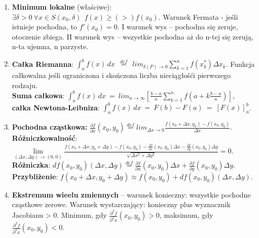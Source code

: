 \documentclass[12pt]{article}
\begin{document}
\begin{enumerate}
        \item \textbf{Minimum lokalne} (właściwe): $\exists \delta > 0 ~ \forall x \in S(x_0, \delta) ~~ f(x) \geq (>) f(x_0)$.
        Warunek Fermata - jeśli istnieje pochodna, to $f'(x_0) = 0$.
        I warunek wys -- pochodna się zeruje, otoczenie zbiega.
        II warunek wys -- wszystkie pochodna aż do n-tej się zerują, n-ta ujemna, n parzyste.

        \item \textbf{Całka Riemanna}: $\int_{a}^{b} f(x) \,dx ~~ \stackrel{def}{=} ~~ lim_{\delta(P)  \rightarrow 0} \sum_{k=1}^{n} f(x^{*}_k) \Delta x_k$.
        Funkcja całkowalna jeśli ograniczona i skończona liczba nieciągłośći pierwszego rodzaju.\\
        \textbf{Suma całkowa}: $\int_{a}^b f(x) \, dx ~ = ~ lim_{n \rightarrow \infty} [\frac{b - a}{n} \sum_{k=1}^n f \left(a + k \frac{b - a}{n}\right)]$,\\
        \textbf{całka Newtona-Leibniza}: $\int_a^b f(x) \,dx ~ = ~ F(b) - F(a) ~ = ~ [F(x)]_a^b$.

        \item \textbf{Pochodna cząstkowa:} $\frac{\partial f}{\partial x}(x_0, y_0)  \stackrel{def}{=} lim_{\Delta x \rightarrow 0} \frac{f(x_0 + \Delta x, y_0) - f(x_0, y_0)}{\Delta x}$.\\
        \textbf{Różniczkowalność}: $\underset{(\Delta x,  \Delta y) \rightarrow (0,0)}{\lim} \frac{f(x_0 + \Delta x, y_0 +  \Delta y) - f(x_0, y_0) - \frac{\partial f}{\partial x}(x_0, y_0)\Delta x - \frac{\partial f}{\partial y}(x_0, y_0) \Delta y}{\sqrt{\Delta x^2 +  \Delta y^2}} = 0$.\\
        \textbf{Różniczka}: $df(x_0, y_0)(\Delta x, \Delta y) \stackrel{def}{=} \frac{\partial f}{\partial x}(x_0, y_0)\Delta x + \frac{\partial f}{\partial y}(x_0, y_0)\Delta y$.\\
        \textbf{Przybliżenie}: $f(x_0 + \Delta x, y_0 + \Delta y) \approx f(x_0, y_0) + df(x_0, y_0)(\Delta x, \Delta y)$.

        \item \textbf{Ekstremum wieelu zmiennych} -- warunek konieczny: wszystkie pochodne cząstkowe zerowe.
        Warunek wystarczający: konieczny plus wyznacznik Jacobianu > 0.
        Minimum, gdy $\frac{\partial^2 f}{\partial^2 x}(x_0, y_0) > 0$,
        maksimum, gdy $\frac{\partial^2 f}{\partial^2 x}(x_0, y_0) < 0$.


\end{enumerate}
\end{document}
